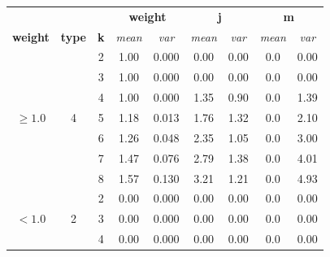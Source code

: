 \begin{table}[htbp]
  \centering
  \begin{tabular}{@{}ccccccccc@{}}
  \toprule
                             &                    &            & \multicolumn{2}{c}{\textbf{weight}} & \multicolumn{2}{c}{\textbf{j}} & \multicolumn{2}{c}{\textbf{m}} \\
  \textbf{weight}            & \textbf{type}      & \textbf{k} & \textit{mean}     & \textit{var}    & \textit{mean}  & \textit{var}  & \textit{mean}  & \textit{var}  \\ \midrule
  \multirow{7}{*}{$\ge 1.0$} & \multirow{7}{*}{4} & 2          & 1.00              & 0.000           & 0.00           & 0.00          & 0.0            & 0.00          \\
                             &                    & 3          & 1.00              & 0.000           & 0.00           & 0.00          & 0.0            & 0.00          \\
                             &                    & 4          & 1.00              & 0.000           & 1.35           & 0.90          & 0.0            & 1.39          \\
                             &                    & 5          & 1.18              & 0.013           & 1.76           & 1.32          & 0.0            & 2.10          \\
                             &                    & 6          & 1.26              & 0.048           & 2.35           & 1.05          & 0.0            & 3.00          \\
                             &                    & 7          & 1.47              & 0.076           & 2.79           & 1.38          & 0.0            & 4.01          \\
                             &                    & 8          & 1.57              & 0.130           & 3.21           & 1.21          & 0.0            & 4.93          \\
  \midrule
  \multirow{14}{*}{$< 1.0$}  & \multirow{7}{*}{2} & 2          & 0.00              & 0.000           & 0.00           & 0.00          & 0.0            & 0.00          \\
                             &                    & 3          & 0.00              & 0.000           & 0.00           & 0.00          & 0.0            & 0.00          \\
                             &                    & 4          & 0.00              & 0.000           & 0.00           & 0.00          & 0.0            & 0.00          \\

\end{tabular}
\end{table}
